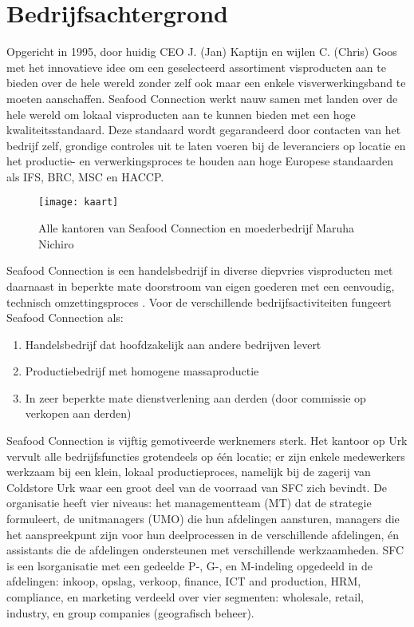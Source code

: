 
\chapter{Bedrijfsachtergrond}
Opgericht in 1995, door huidig CEO J. (Jan) Kaptijn en wijlen C. (Chris) Goos met het innovatieve idee om een geselecteerd assortiment visproducten aan te bieden over de hele wereld zonder zelf ook maar een enkele visverwerkingsband te moeten aanschaffen. Seafood Connection werkt nauw samen met landen over de hele wereld om lokaal visproducten aan te kunnen bieden met een hoge kwaliteitsstandaard. Deze standaard wordt gegarandeerd door contacten van het bedrijf zelf, grondige controles uit te laten voeren bij de leveranciers op locatie en het productie- en verwerkingsproces te houden aan hoge Europese standaarden als IFS, BRC, MSC en HACCP. \citep{sfcreglement}

\begin{figure}[!h]
    \centering
    \texttt{[image: kaart]}
    \caption{Alle kantoren van Seafood Connection en moederbedrijf Maruha Nichiro \citep{sfcwebsite}}
    \label{fig:kantorensfc}
\end{figure}

Seafood Connection is een handelsbedrijf in diverse diepvries visproducten met daarnaast in beperkte mate doorstroom van eigen goederen met een eenvoudig, technisch omzettingsproces \citep{aoibsfc}. Voor de verschillende bedrijfsactiviteiten fungeert Seafood Connection als:

\begin{enumerate}
    \item Handelsbedrijf dat hoofdzakelijk aan andere bedrijven levert
    \item Productiebedrijf met homogene massaproductie
    \item In zeer beperkte mate dienstverlening aan derden (door commissie op verkopen aan derden)
\end{enumerate}

Seafood Connection is vijftig gemotiveerde werknemers sterk. Het kantoor op Urk vervult alle bedrijfsfuncties grotendeels op één locatie; er zijn enkele medewerkers werkzaam bij een klein, lokaal productieproces, namelijk bij de zagerij van Coldstore Urk waar een groot deel van de voorraad van SFC zich bevindt. De organisatie heeft vier niveaus: het managementteam (MT) dat de strategie formuleert, de unitmanagers (UMO) die hun afdelingen aansturen, managers die het aanspreekpunt zijn voor hun deelprocessen in de verschillende afdelingen, én assistants die de afdelingen ondersteunen met verschillende werkzaamheden. SFC is een \gls{lsorganisatie} met een gedeelde P-, G-, en M-indeling opgedeeld in de afdelingen: inkoop, opslag, verkoop, finance, ICT and production, HRM, compliance, en marketing verdeeld over vier segmenten: wholesale, retail, industry, en group companies (geografisch beheer). \citep{quickscan,sfcreglement}

